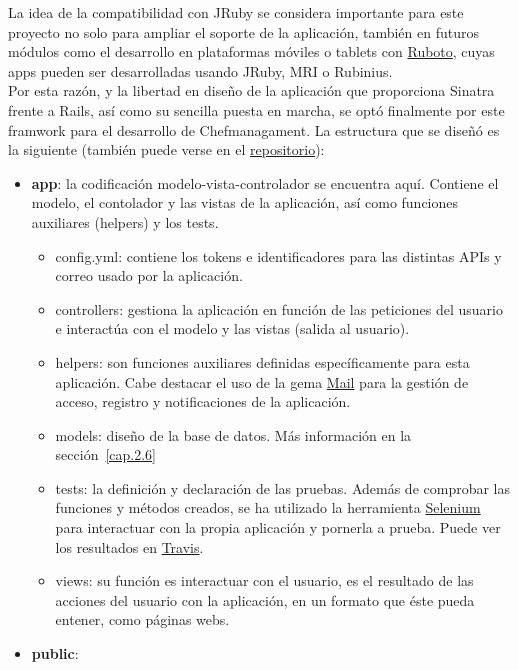 La idea de la compatibilidad con JRuby se considera importante para este proyecto no solo para ampliar el soporte de la aplicación, también en futuros módulos como el desarrollo en plataformas móviles o tablets con \href{http://ruboto.org/}{Ruboto}, cuyas apps pueden ser desarrolladas usando JRuby, MRI o Rubinius. \\

Por esta razón, y la libertad en diseño de la aplicación que proporciona Sinatra frente a Rails, así como su sencilla puesta en marcha, se optó finalmente por este framwork para el desarrollo de Chefmanagament. La estructura que se diseñó es la siguiente (también puede verse en el \href{https://github.com/alu0100207385/ChefManagement}{repositorio}):

\begin{itemize}
	\item \textbf{app}: la codificación modelo-vista-controlador se encuentra aquí. Contiene el modelo, el contolador y las vistas de la aplicación, así como funciones auxiliares (helpers) y los tests.
		\begin{itemize}
			\item config.yml: contiene los tokens e identificadores para las distintas APIs y correo usado por la aplicación.
			\item controllers: gestiona la aplicación en función de las peticiones del usuario e interactúa con el modelo y las vistas (salida al usuario).
			\item helpers: son funciones auxiliares definidas específicamente para esta aplicación. Cabe destacar el uso de la gema \href{https://github.com/mikel/mail}{Mail} para la gestión de acceso, registro y notificaciones de la aplicación.
			\item models: diseño de la base de datos. Más información en la sección~\ref{cap.2.6}
			\item tests: la definición y declaración de las pruebas. Además de comprobar las funciones y métodos creados, se ha utilizado la herramienta \href{http://www.seleniumhq.org/}{Selenium} para interactuar con la propia aplicación y pornerla a prueba. Puede ver los resultados en \href{https://travis-ci.org/alu0100207385/ChefManagement?branch=testing}{Travis}.
			\item views: su función es interactuar con el usuario, es el resultado de las acciones del usuario con la aplicación, en un formato que éste pueda entener, como páginas webs.
		\end{itemize}
	\item \textbf{public}:

\end{itemize}
